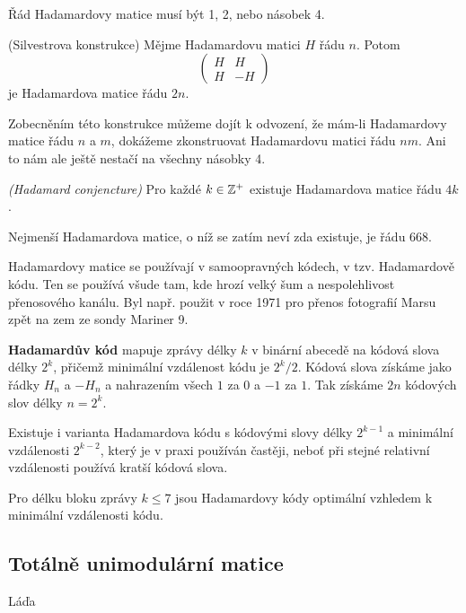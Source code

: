 \tv Řád Hadamardovy matice musí být 1, 2, nebo násobek 4.

\alg (Silvestrova konstrukce) Mějme Hadamardovu matici $H$ řádu $n$. Potom 
$$\begin{pmatrix}
H & H \\
H & -H
\end{pmatrix}$$
je Hadamardova matice řádu $2n$.

Zobecněním této konstrukce můžeme dojít k odvození, že mám-li Hadamardovy matice
řádu $n$ a $m$, dokážeme zkonstruovat Hadamardovu matici řádu $nm$. Ani to nám
ale ještě nestačí na všechny násobky 4.

\conj \emph{(Hadamard conjencture)} Pro každé $k \in \mathbb{Z}^+$ existuje Hadamardova
matice řádu $4k$.

\smallskip
Nejmenší Hadamardova matice, o níž se zatím neví zda existuje, je řádu 668.

\smallskip
Hadamardovy matice se používají v samoopravných kódech, v tzv. Hadamardově kódu.
Ten se používá všude tam, kde hrozí velký šum a nespolehlivost přenosového
kanálu. Byl např. použit v roce 1971 pro přenos fotografií Marsu zpět na zem ze
sondy Mariner 9.

\smallskip\noindent\textbf{Hadamardův kód} mapuje zprávy délky $k$ v binární
abecedě na kódová slova délky $2^k$, přičemž minimální vzdálenost kódu je
$2^k/2$. Kódová slova získáme jako řádky $H_n$ a $-H_n$ a nahrazením všech
$1$ za $0$ a $-1$ za $1$. Tak získáme $2n$ kódových slov délky $n = 2^k$.

Existuje i varianta Hadamardova kódu s kódovými slovy délky $2^{k-1}$ a
minimální vzdálenosti $2^{k-2}$, který je v praxi používán častěji, neboť při
stejné relativní vzdálenosti používá kratší kódová slova.

\tv Pro délku bloku zprávy $k \le 7$ jsou Hadamardovy kódy optimální vzhledem k
minimální vzdálenosti kódu.

\subsection{Totálně unimodulární matice}

\todo Láďa

